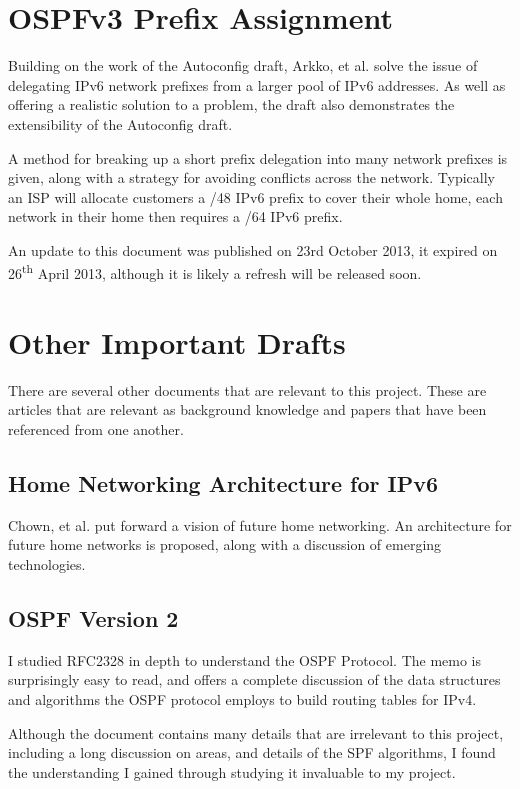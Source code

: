 \section{OSPFv3 Prefix Assignment}
Building on the work of the Autoconfig draft, Arkko, et
al.\cite{draft-arkko-homenet-prefix-assignment-03} solve the issue of
delegating IPv6 network prefixes from a larger pool of IPv6 addresses. As well
as offering a realistic solution to a problem, the draft also demonstrates the
extensibility of the Autoconfig draft. 

A method for breaking up a short prefix delegation into many network prefixes
is given, along with a strategy for avoiding conflicts across the network.
Typically an ISP will allocate customers a /48 IPv6 prefix to cover their
whole home, each network in their home then requires a /64 IPv6 prefix.

An update to this document was published on 23rd October 2013, it expired on
26\textsuperscript{th} April 2013, although it is likely a refresh will be
released soon.

\section{Other Important Drafts}
There are several other documents that are relevant to this project. These are
articles that are relevant as background knowledge and papers that have
been referenced from one another.

\subsection{Home Networking Architecture for IPv6} 
Chown, et al.\cite{draft-ietf-homenet-arch-07} put forward a vision of future
home networking. An architecture for future home networks is proposed, along
with a discussion of emerging technologies. 

\subsection{OSPF Version 2}
I studied RFC2328\cite{rfc2328} in depth to understand the OSPF Protocol. The
memo is surprisingly easy to read, and offers a complete discussion of the data
structures and algorithms the OSPF protocol employs to build routing tables for
IPv4. 

Although the document contains many details that are irrelevant to this project, 
including a long discussion on areas, and details of the SPF algorithms, I found
the understanding I gained through studying it invaluable to my project.

